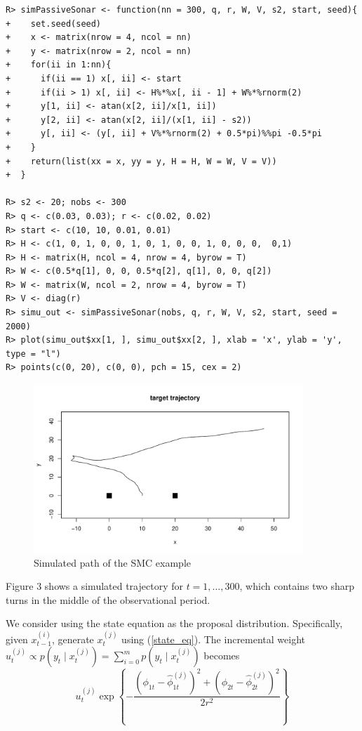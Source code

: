 \begin{verbatim}
R> simPassiveSonar <- function(nn = 300, q, r, W, V, s2, start, seed){
+    set.seed(seed)
+    x <- matrix(nrow = 4, ncol = nn)
+    y <- matrix(nrow = 2, ncol = nn)
+    for(ii in 1:nn){    
+      if(ii == 1) x[, ii] <- start
+      if(ii > 1) x[, ii] <- H%*%x[, ii - 1] + W%*%rnorm(2)
+      y[1, ii] <- atan(x[2, ii]/x[1, ii])
+      y[2, ii] <- atan(x[2, ii]/(x[1, ii] - s2))
+      y[, ii] <- (y[, ii] + V%*%rnorm(2) + 0.5*pi)%%pi -0.5*pi
+    }
+    return(list(xx = x, yy = y, H = H, W = W, V = V))
+  }

R> s2 <- 20; nobs <- 300  
R> q <- c(0.03, 0.03); r <- c(0.02, 0.02)
R> start <- c(10, 10, 0.01, 0.01)
R> H <- c(1, 0, 1, 0, 0, 1, 0, 1, 0, 0, 1, 0, 0, 0,  0,1)
R> H <- matrix(H, ncol = 4, nrow = 4, byrow = T)
R> W <- c(0.5*q[1], 0, 0, 0.5*q[2], q[1], 0, 0, q[2])
R> W <- matrix(W, ncol = 2, nrow = 4, byrow = T)
R> V <- diag(r)
R> simu_out <- simPassiveSonar(nobs, q, r, W, V, s2, start, seed = 2000)
R> plot(simu_out$xx[1, ], simu_out$xx[2, ], xlab = 'x', ylab = 'y', type = "l")
R> points(c(0, 20), c(0, 0), pch = 15, cex = 2)
\end{verbatim}
\begin{figure}\label{SMC1}
\centering
\includegraphics[width=4in]{SMC1.pdf}
\caption{Simulated path of the SMC example}
\end{figure}


Figure 3 shows a simulated trajectory for $t=1,\ldots, 300$, which contains two sharp turns in the middle of the observational period. 


We consider using the state equation as the proposal distribution. Specifically, given $x_{t-1}^{(i)}$, generate $x_t^{(j)}$ using (\ref{state_eq}). The incremental weight $u_t^{(j)} \propto p(y_t \mid x_t^{(j)})=\sum_{i=0}^m p(y_t \mid x_t^{(j)})$ becomes
\[
u_t^{(j)} \exp \left\{- \frac{(\phi_{1t}-\hat{\phi}_{1t}^{(j)})^2 +(\phi_{2t}-\hat{\phi}_{2t}^{(j)})^2}{2 r^2} \right\}
\]

